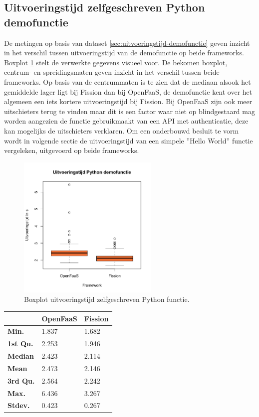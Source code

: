 \subsection{Uitvoeringstijd zelfgeschreven Python demofunctie}
De metingen op basis van dataset \ref{sec:uitvoeringstijd-demofunctie} geven inzicht in het verschil tussen uitvoeringstijd van de demofunctie op beide frameworks. Boxplot \ref{fig:boxplot-demo-functie} stelt de verwerkte gegevens visueel voor. De bekomen boxplot, centrum- en spreidingsmaten geven inzicht in het verschil tussen beide frameworks. Op  basis van de centrummaten is te zien dat de mediaan alsook het gemiddelde lager ligt bij Fission dan bij OpenFaaS, de demofunctie kent over het algemeen een iets kortere uitvoeringstijd bij Fission. Bij OpenFaaS zijn ook meer uitschieters terug te vinden maar dit is een factor waar niet op blindgestaard mag worden aangezien de functie gebruikmaakt van een API met authenticatie, deze kan mogelijks de uitschieters verklaren. Om een onderbouwd besluit te vorm wordt in volgende sectie de uitvoeringstijd van een simpele ''Hello World'' functie vergeleken, uitgevoerd op beide frameworks.
\begin{figure}
    \centering
    \includegraphics[width=0.6\textwidth]{img/boxplot-uitvoeringstijd-demofunctie.png}
    \caption{Boxplot uitvoeringstijd zelfgeschreven Python functie.}
    \label{fig:boxplot-demo-functie}
\end{figure}

\begin{tabular}{@{}lll@{}}
    \toprule
    & \textbf{OpenFaaS} & \textbf{Fission} \\ \midrule
    \textbf{Min.} & 1.837 & 1.682 \\
    \textbf{1st Qu.} & 2.253 & 1.946 \\
    \textbf{Median} & 2.423 & 2.114 \\
    \textbf{Mean} & 2.473 & 2.146 \\
    \textbf{3rd Qu.} & 2.564 & 2.242 \\
    \textbf{Max.} & 6.436 & 3.267 \\
    \textbf{Stdev.} & 0.423 & 0.267 \\ \bottomrule
\end{tabular}



